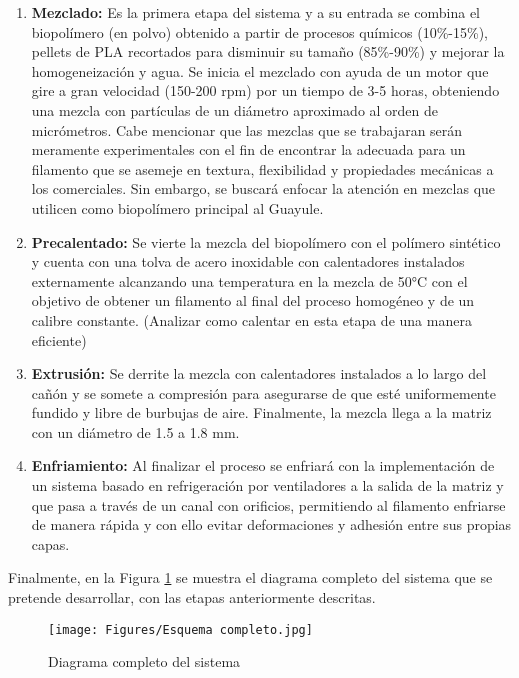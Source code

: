 \documentclass[14pt,oneside]{extarticle} %
\begin{document}
\begin{enumerate}
    \item \textbf{Mezclado:} Es la primera etapa del sistema y a su entrada se combina el biopolímero (en polvo) obtenido a partir de procesos químicos (10\%-15\%), pellets de PLA recortados para disminuir su tamaño (85\%-90\%) y mejorar la homogeneización y agua. Se inicia el mezclado con ayuda de un motor que gire a gran velocidad (150-200 rpm) por un tiempo de 3-5 horas, obteniendo una mezcla con partículas de un diámetro aproximado al orden de micrómetros. Cabe mencionar que las mezclas que se trabajaran serán meramente experimentales con el fin de encontrar la adecuada para un filamento que se asemeje en textura, flexibilidad y propiedades mecánicas a los comerciales. Sin embargo, se buscará enfocar la atención en mezclas que utilicen como biopolímero principal al Guayule.
    \item \textbf{Precalentado:} Se vierte la mezcla del biopolímero con el polímero sintético y cuenta con una tolva de acero inoxidable con calentadores instalados externamente alcanzando una temperatura en la mezcla de 50°C con el objetivo de obtener un filamento al final del proceso homogéneo y de un calibre constante. (Analizar como calentar en esta etapa de una manera eficiente)
    \item \textbf{Extrusión:} Se derrite la mezcla con calentadores instalados a lo largo del cañón y se somete a compresión para asegurarse de que esté uniformemente fundido y libre de burbujas de aire. Finalmente, la mezcla llega a la matriz con un diámetro de 1.5 a 1.8 mm.
    \item \textbf{Enfriamiento:} Al finalizar el proceso se enfriará con la implementación de un sistema basado en refrigeración por ventiladores a la salida de la matriz y que pasa a través de un canal con orificios, permitiendo al filamento enfriarse de manera rápida y con ello evitar deformaciones y adhesión entre sus propias capas.
\end{enumerate}

Finalmente, en la Figura \ref{fig:DiagramaSistemaCompleto} se muestra el diagrama completo del sistema que se pretende desarrollar, con las etapas anteriormente descritas.

\begin{figure}[H]
    \centering
    \texttt{[image: Figures/Esquema completo.jpg]}
    \caption{Diagrama completo del sistema}
    \label{fig:DiagramaSistemaCompleto}
\end{figure}
\end{document}
